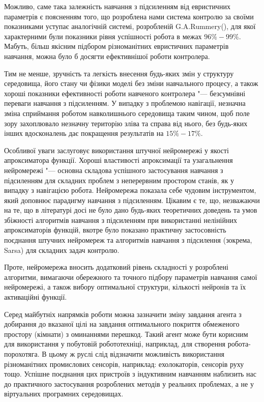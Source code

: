 \documentclass[a4paper,10pt,fleqn]{article}
\begin{document}
Можливо, саме така залежність навчання з підсиленням від евристичних параметрів є поясненням того, що розроблена нами система контролю за своїми показниками уступає аналогічній системі, розробленій G.A.Rummery(\cite{Rummery1995}), для якої характерними були показники рівня успішності робота в межах $96\%-99\%$. Мабуть, більш якісним підбором різноманітних евристичних параметрів навчання, можна було б досягти ефективнішої роботи контролера.

Тим не менше, зручність та легкість внесення будь-яких змін у структуру середовища, його стану чи фізики моделі без зміни навчального процесу, а також хороші показники ефективності роботи навченого контролера "--- безсумнівні переваги навчання з підсиленням. У випадку з проблемою навігації, незначна зміна сприймання роботом навколишнього середовища таким чином, щоб поле зору захоплювало незначну територію зліва та справа від нього, без будь-яких інших вдосконалень дає покращення результатів на $15\%-17\%$. 

Особливої уваги заслуговує використання штучної нейромережі у якості апроксиматора функції. Хороші властивості апроксимації та узагальнення нейромережі "--- основна складова успішного застосування навчання з підсиленням для складних проблем з неперервним простором станів, як у випадку з навігацією робота. Нейромережа показала себе чудовим інструментом, який доповнює парадигму навчання з підсиленням. Цікавим є те, що, незважаючи на те, що в літературі досі не було дано будь-яких теоретичних доведень та умов збіжності алгоритмів навчання з підсиленням при використанні нелінійних апроксиматорів функцій, вкотре було показано практичну застосовність поєднання штучних нейромереж та алгоритмів навчання з підсилення (зокрема, Sarsa) для складних задач контролю. 

Проте, нейромережа вносить додатковий рівень складності у розроблені алгоритми, вимагаючи обережного та точного підбору параметрів навчання самої нейромережі, а також вибору оптимальної структури, кількості нейронів та їх активаційні функції. 

Серед майбутніх напрямків роботи можна зазначити зміну завдання агента з добирання до вказаної цілі на завдання оптимального покриття обмеженого простору (кімнати) з оминаннями перешкод. Такий агент може бути корисним для використання у побутовій робототехніці, наприклад, для створення робота-порохотяга. В цьому ж руслі слід відзначити можливість використання різноманітних промислових сенсорів, наприклад: ехолокаторів, сенсорів руху тощо. Успішне поєднання цих пристроїв з індуктивним навчанням наблизить нас до практичного застосування розроблених методів у реальних проблемах, а не у віртуальних програмних середовищах.
\end{document}
